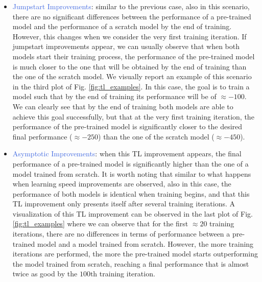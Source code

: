 \begin{itemize}
	\item \textcolor{RoyalBlue}{Jumpstart Improvements}: similar to the previous case, also in this scenario, there are no significant differences between the performance of a pre-trained model and the performance of a scratch model by the end of training. However, this changes when we consider the very first training iteration. If jumpstart improvements appear, we can usually observe that when both models start their training process, the performance of the pre-trained model is much closer to the one that will be obtained by the end of training than the one of the scratch model. We visually report an example of this scenario in the third plot of Fig. \ref{fig:tl_examples}. In this case, the goal is to train a model such that by the end of training its performance will be of $\approx -100$. We can clearly see that by the end of training both models are able to achieve this goal successfully, but that at the very first training iteration, the performance of the pre-trained model is significantly closer to the desired final performance ($\approx -250$) than the one of the scratch model ($\approx -450$). 
	\item \textcolor{RoyalBlue}{Asymptotic Improvements}: when this TL improvement appears, the final performance of a pre-trained model is significantly higher than the one of a model trained from scratch. It is worth noting that similar to what happens when learning speed improvements are observed, also in this case, the performance of both models is identical when training begins, and that this TL improvement only presents itself after several training iterations. A visualization of this TL improvement can be observed in the last plot of Fig. \ref{fig:tl_examples} where we can observe that for the first $\approx 20$ training iterations, there are no differences in terms of performance between a pre-trained model and a model trained from scratch. However, the more training iterations are performed, the more the pre-trained model starts outperforming the model trained from scratch, reaching a final performance that is almost twice as good by the $100\text{th}$ training iteration.
\end{itemize}



